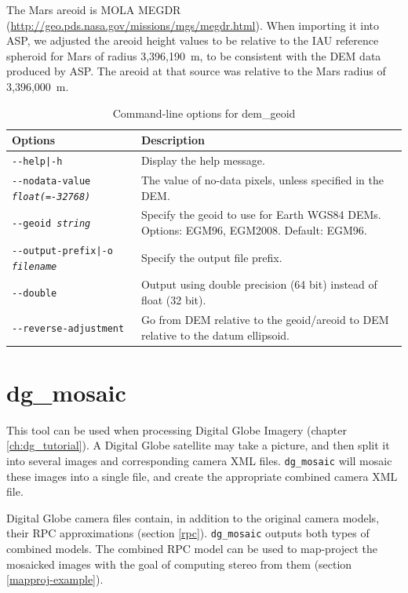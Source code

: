 The Mars areoid is MOLA MEGDR
(\url{http://geo.pds.nasa.gov/missions/mgs/megdr.html}). When importing
it into ASP, we adjusted the areoid height values to be relative to
the IAU reference spheroid for Mars of radius 3,396,190~m, to be
consistent with the DEM data produced by ASP. The areoid at that source was
relative to the Mars radius of 3,396,000~m.

\begin{longtable}{|l|p{10cm}|}
\caption{Command-line options for dem\_geoid}
\label{tbl:demgeoid}
\endfirsthead
\endhead
\endfoot
\endlastfoot
\hline
Options & Description \\ \hline \hline
\texttt{-\/-help|-h} & Display the help message.\\ \hline
\texttt{-\/-nodata-value \textit{float(=-32768)}} & The value of no-data pixels, unless specified in the DEM. \\ \hline
\texttt{-\/-geoid \textit{string}} & Specify the geoid to use for Earth WGS84 DEMs.
                               Options: EGM96, EGM2008. Default: EGM96. \\ \hline
\texttt{-\/-output-prefix|-o \textit{filename}} & Specify the output file prefix. \\ \hline
\texttt{-\/-double} & Output using double precision (64 bit) instead of float (32 bit).\\ \hline
\texttt{-\/-reverse-adjustment} & Go from DEM relative to the geoid/areoid to DEM relative to the datum ellipsoid.\\ \hline
\end{longtable}

\section{dg\_mosaic}
\label{dgmosaic}

This tool can be used when processing Digital Globe Imagery (chapter
\ref{ch:dg_tutorial}). A Digital Globe satellite may take a
picture, and then split it into several images and corresponding camera
XML files. \texttt{dg\_mosaic} will mosaic these images into a single
file, and create the appropriate combined camera XML file.

Digital Globe camera files contain, in addition to the original camera
models, their RPC approximations (section
\ref{rpc}). \texttt{dg\_mosaic} outputs both types of combined
models. The combined RPC model can be used to map-project the mosaicked
images with the goal of computing stereo from them (section
\ref{mapproj-example}).

